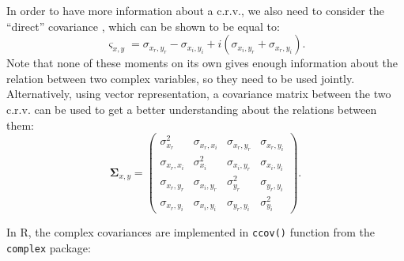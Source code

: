 \documentclass[
]{book}
\begin{document}
In order to have more information about a c.r.v., we also need to consider the ``direct'' covariance \citep[also known in the literature as pseudo-covariance,][]{reference}, which can be shown to be equal to:
\begin{equation}
    \varsigma_{x,y} = \sigma_{x_r, y_r} - \sigma_{x_i, y_i} + i (\sigma_{x_i, y_r} + \sigma_{x_r, y_i}).
    \label{eq:crvMomentSecondPseudoCovarianceShort}
\end{equation}
Note that none of these moments on its own gives enough information about the relation between two complex variables, so they need to be used jointly. Alternatively, using vector representation, a covariance matrix between the two c.r.v. can be used to get a better understanding about the relations between them:
\begin{equation}
    \boldsymbol{\Sigma}_{x,y} =
        \begin{pmatrix}
            \sigma_{x_r}^2 & \sigma_{x_r, x_i} & \sigma_{x_r, y_r} & \sigma_{x_r, y_i} \\
            \sigma_{x_r, x_i} & \sigma_{x_i}^2 & \sigma_{x_i, y_r} & \sigma_{x_i, y_i} \\
            \sigma_{x_r, y_r} & \sigma_{x_i, y_r} & \sigma_{y_r}^2 & \sigma_{y_r, y_i} \\
            \sigma_{x_r, y_i} & \sigma_{x_i, y_i} & \sigma_{y_r, y_i} & \sigma_{y_i}^2
        \end{pmatrix} .
    \label{eq:crvMomentSecondCoVarianceMatrix}
\end{equation}

In R, the complex covariances are implemented in \texttt{ccov()} function from the \texttt{complex} package:
\end{document}
